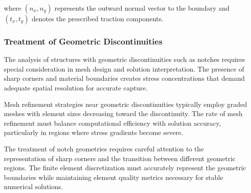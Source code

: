 \documentclass[12pt,a4paper]{report}
\begin{document}
where $(n_x, n_y)$ represents the outward normal vector to the boundary and $(t_x, t_y)$ denotes the prescribed traction components.



\subsubsection{Treatment of Geometric Discontinuities}

The analysis of structures with geometric discontinuities such as notches requires special consideration in mesh design and solution interpretation. The presence of sharp corners and material boundaries creates stress concentrations that demand adequate spatial resolution for accurate capture.

Mesh refinement strategies near geometric discontinuities typically employ graded meshes with element sizes decreasing toward the discontinuity. The rate of mesh refinement must balance computational efficiency with solution accuracy, particularly in regions where stress gradients become severe.

The treatment of notch geometries requires careful attention to the representation of sharp corners and the transition between different geometric regions. The finite element discretization must accurately represent the geometric boundaries while maintaining element quality metrics necessary for stable numerical solutions.


 
\end{document}
